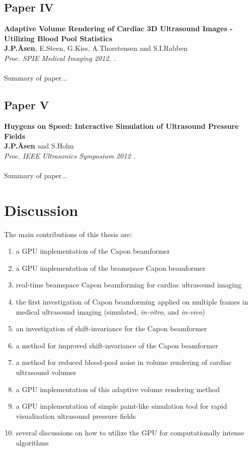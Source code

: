\subsection{Paper IV}
\textbf{Adaptive Volume Rendering of Cardiac 3D Ultrasound Images - Utilizing Blood Pool Statistics}\\
\textbf{J.\:P.\:\AA{}sen}, E.\:Steen, G.\:Kiss, A.\:Thorstensen and S.\:I.\:Rabben\\
{\it Proc. SPIE Medical Imaging 2012, .}\\\\
Summary of paper...

\subsection{Paper V}
\textbf{Huygens on Speed: Interactive Simulation of Ultrasound Pressure Fields}\\
\textbf{J.\:P.\:\AA{}sen} and S.\:Holm\\
{\it Proc. IEEE Ultrasonics Symposium 2012 .}\\\\
Summary of paper...

\section{Discussion}
The main contributions of this thesis are:
\begin{enumerate}
\item a GPU implementation of the Capon beamformer
\item a GPU implementation of the beamspace Capon beamformer
\item real-time beamspace Capon beamforming for cardiac ultrasound imaging
\item the first investigation of Capon beamforming applied on multiple frames in medical ultrasound imaging (simulated, \textit{in-vitro}, and \textit{in-vivo})
\item an investigation of shift-invariance for the Capon beamformer
\item a method for improved shift-invariance of the Capon beamformer
\item a method for reduced blood-pool noise in volume rendering of cardiac ultrasound volumes
\item a GPU implementation of this adaptive volume rendering method
\item a GPU implementation of simple paint-like simulation tool for rapid visualization ultrasound pressure fields
\item several discussions on how to utilize the GPU for computationally intense algorithms  
\end{enumerate}

